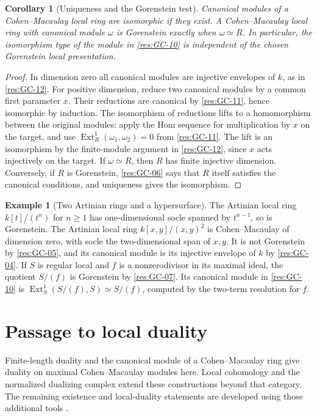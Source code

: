 \documentclass[11pt,oneside,openany]{book}
\newtheorem{corollary}[theorem]{Corollary}
\theoremstyle{definition}
\newtheorem{example}[theorem]{Example}
\theoremstyle{remark}
\begin{document}
\begin{corollary}[Uniqueness and the Gorenstein test]
\label{res:GC-13}
Canonical modules of a Cohen--Macaulay local ring are
isomorphic if they exist. A Cohen--Macaulay local ring
with canonical module $\omega$ is Gorenstein exactly when
$\omega\simeq R$. In particular, the isomorphism type
of the module in \ref{res:GC-10} is independent of the
chosen Gorenstein local presentation.
\end{corollary}
\begin{proof}
In dimension zero all canonical modules are injective
envelopes of $k$, as in \ref{res:GC-12}. For positive
dimension, reduce two canonical modules by a common
first parameter $x$. Their reductions are canonical by
\ref{res:GC-11}, hence isomorphic by induction. The
isomorphism of reductions lifts to a homomorphism
between the original modules: apply the Hom sequence
for multiplication by $x$ on the target, and use
$\operatorname{Ext}^1_R(\omega_1,\omega_2)=0$ from
\ref{res:GC-11}. The lift is an isomorphism by the
finite-module argument in \ref{res:GC-12}, since $x$
acts injectively on the target. If $\omega\simeq R$,
then $R$ has finite injective dimension. Conversely,
if $R$ is Gorenstein, \ref{res:GC-06} says that $R$
itself satisfies the canonical conditions, and
uniqueness gives the isomorphism.
\end{proof}

\begin{example}[Two Artinian rings and a hypersurface]\label{res:GC-14}
The Artinian local ring $k[t]/(t^n)$ for $n\ge1$ has
one-dimensional socle spanned by $t^{n-1}$, so is
Gorenstein. The Artinian local ring
$k[x,y]/(x,y)^2$ is Cohen--Macaulay of dimension zero,
with socle the two-dimensional span of $x,y$. It is
not Gorenstein by \ref{res:GC-05}, and its canonical
module is its injective envelope of $k$ by
\ref{res:GC-04}. If $S$ is regular local and $f$ is a
nonzerodivisor in its maximal ideal, the quotient
$S/(f)$ is Gorenstein by \ref{res:GC-07}. Its canonical
module in \ref{res:GC-10} is
$\operatorname{Ext}^1_S(S/(f),S)\simeq S/(f)$, computed
by the two-term resolution for $f$.
\end{example}

\section*{Passage to local duality}

Finite-length duality and the canonical module of a
Cohen--Macaulay ring give duality on maximal
Cohen--Macaulay modules here. Local cohomology and the
normalized dualizing complex extend these constructions
beyond that category. The remaining existence and
local-duality statements are developed using those
additional tools \cite[Section 3.5]{brunsherzog}.
\end{document}
